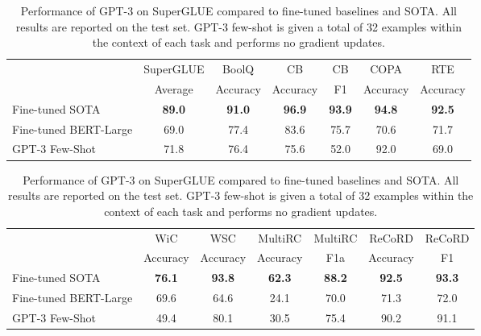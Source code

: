 \documentclass{article}
\begin{document}
    
\begin{table}
    
\begin{center}
\begin{tabular}{lcccccc}
\toprule
                 &  SuperGLUE &     BoolQ &        CB &    CB &      COPA &       RTE \\
                 &    Average &  Accuracy &  Accuracy &    F1 &  Accuracy &  Accuracy \\
\midrule
Fine-tuned SOTA & \textbf{89.0} & \textbf{91.0} & \textbf{96.9} & \textbf{93.9} & \textbf{94.8} & \textbf{92.5} \\        
 Fine-tuned BERT-Large &       69.0 &      77.4 &      83.6 &  75.7 &      70.6 &      71.7 \\
GPT-3 Few-Shot &       71.8 &      76.4 &      75.6 &  52.0 &      92.0 &      69.0 \\
\end{tabular}
\end{center}

\begin{center}
\begin{tabular}{lcccccc}
\toprule
                 &       WiC &       WSC &   MultiRC &  MultiRC &    ReCoRD &  ReCoRD \\
                 &  Accuracy &  Accuracy &  Accuracy &      F1a &  Accuracy &      F1 \\
\midrule
       Fine-tuned SOTA &   \textbf{76.1} &   \textbf{93.8} &   \textbf{62.3} &  \textbf{88.2} &   \textbf{92.5} & \textbf{93.3} \\
 Fine-tuned BERT-Large &      69.6 &      64.6 &      24.1 &     70.0 &      71.3 &    72.0 \\
        GPT-3 Few-Shot &      49.4 &      80.1 &      30.5 &     75.4 &      90.2 &    91.1 \\
\bottomrule
\end{tabular}
\end{center}

    \caption{
    Performance of GPT-3 on SuperGLUE compared to fine-tuned baselines and SOTA. All results are reported on the test set. GPT-3 few-shot is given a total of 32 examples within the context of each task and performs no gradient updates.
    }
    \label{table:superglue}
\end{table}
\end{document}
